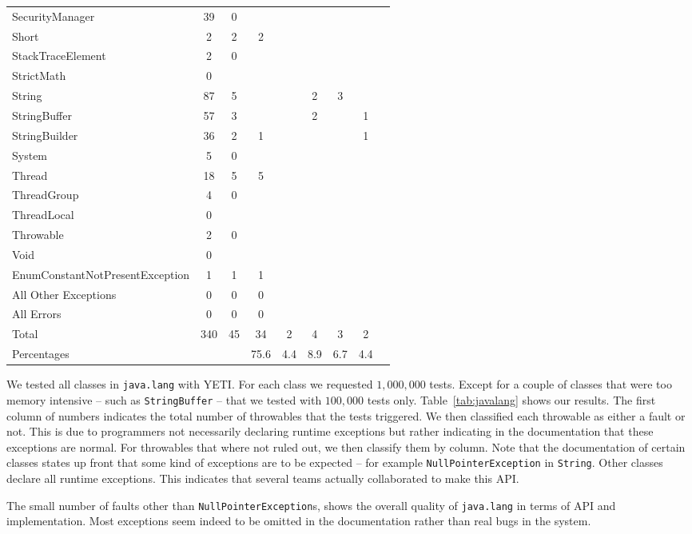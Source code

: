 \begin{table*}[ht!]
{\begin{minipage}{\textwidth}
{\begin{center}
\begin{tabular}{l c c c c c c c c}
SecurityManager &39&0&&&&&\\
Short &2&2&2&&&&\\
StackTraceElement &2&0&&&&&\\
StrictMath &0&&&&&&\\
String &87&5&&&2&3&\\
StringBuffer &57&3&&&2&&1\\
StringBuilder &36&2&1&&&&1\\
System &5&0&&&&&\\
Thread &18&5&5&&&&\\
ThreadGroup &4&0&&&&&\\
ThreadLocal &0&&&&&&\\
Throwable &2&0&&&&&\\
Void&0&&&&&&\\
EnumConstantNotPresentException&1&1&1&&&&\\
All Other Exceptions  &0&0&0&&&&\\
All Errors  &0&0&0&&&&\\
\hline
Total&340&45&34&2&4&3&2\\
\hline
Percentages&&&75.6&4.4&8.9&6.7&4.4\\
\hline
\end{tabular}
\end{center}
}
\end{minipage}}

\end{table*}

We tested all classes in \texttt{java.lang} with YETI. For each class we requested $1,000,000$ tests. Except for a couple of classes that were too memory intensive -- such as \texttt{StringBuffer} -- that we tested with $100,000$ tests only.
Table~\ref{tab:javalang} shows our results. The first column of numbers indicates the total number of
throwables that the tests triggered. We then classified each throwable as either a fault or not. This is due to programmers not necessarily declaring runtime exceptions but rather indicating in the documentation that these exceptions are normal. For throwables that where not ruled out, 
we then classify them by column. Note that the documentation of certain classes states up front that
some kind of exceptions are to be expected -- for example \texttt{NullPointerException} in \texttt{String}.
Other classes declare all runtime exceptions. This indicates that several teams actually collaborated to make this API. 

The small number of faults other than \texttt{NullPointerException}s, shows the overall quality of \texttt{java.lang} in terms of API and implementation. Most exceptions seem indeed to be omitted in the documentation rather than real bugs in the system.

